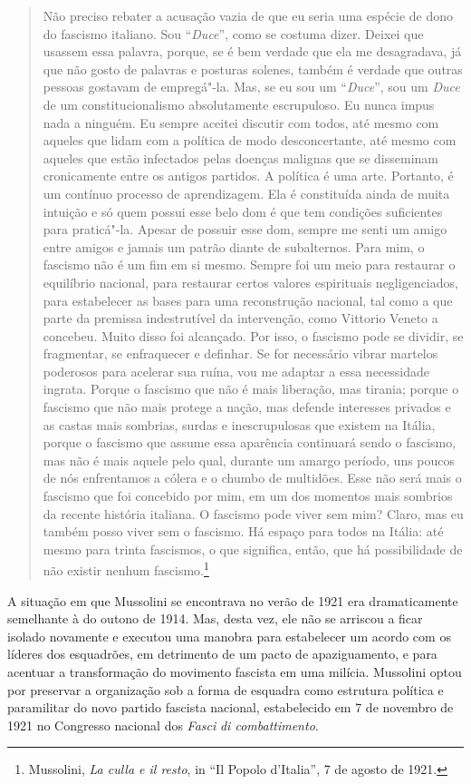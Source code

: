 \begin{quote}
Não preciso rebater a acusação vazia de que eu seria uma espécie de dono
do fascismo italiano. Sou ``\emph{Duce}'', como se costuma dizer. Deixei
que usassem essa palavra, porque, se é bem verdade que ela me
desagradava, já que não gosto de palavras e posturas solenes, também é
verdade que outras pessoas gostavam de empregá"-la. Mas, se eu sou um
``\emph{Duce}'', sou um \emph{Duce} de um constitucionalismo
absolutamente escrupuloso. Eu nunca impus nada a ninguém. Eu sempre
aceitei discutir com todos, até mesmo com aqueles que lidam com a
política de modo desconcertante, até mesmo com aqueles que estão
infectados pelas doenças malignas que se disseminam cronicamente entre
os antigos partidos. A política é uma arte. Portanto, é um contínuo
processo de aprendizagem. Ela é constituída ainda de muita intuição e só
quem possui esse belo dom é que tem condições suficientes para
praticá"-la. Apesar de possuir esse dom, sempre me senti um amigo entre
amigos e jamais um patrão diante de subalternos. Para mim, o fascismo
não é um fim em si mesmo. Sempre foi um meio para restaurar o equilíbrio
nacional, para restaurar certos valores espirituais negligenciados, para
estabelecer as bases para uma reconstrução nacional, tal como a que
parte da premissa indestrutível da intervenção, como Vittorio Veneto a
concebeu. Muito disso foi alcançado. Por isso, o fascismo pode se
dividir, se fragmentar, se enfraquecer e definhar. Se for necessário
vibrar martelos poderosos para acelerar sua ruína, vou me adaptar a essa
necessidade ingrata. Porque o fascismo que não é mais liberação, mas
tirania; porque o fascismo que não mais protege a nação, mas defende
interesses privados e as castas mais sombrias, surdas e inescrupulosas
que existem na Itália, porque o fascismo que assume essa aparência
continuará sendo o fascismo, mas não é mais aquele pelo qual, durante um
amargo período, uns poucos de nós enfrentamos a cólera e o chumbo de
multidões. Esse não será mais o fascismo que foi concebido por mim, em
um dos momentos mais sombrios da recente história italiana. O fascismo
pode viver sem mim? Claro, mas eu também posso viver sem o fascismo. Há
espaço para todos na Itália: até mesmo para trinta fascismos, o que
significa, então, que há possibilidade de não existir nenhum
fascismo.\footnote{Mussolini, \emph{La culla e il resto}, in ``Il Popolo
  d'Italia'', 7 de agosto de 1921.}
\end{quote}

A situação em que Mussolini se encontrava no verão de 1921 era
dramaticamente semelhante à do outono de 1914. Mas, desta vez, ele não
se arriscou a ficar isolado novamente e executou uma manobra para
estabelecer um acordo com os líderes dos esquadrões, em detrimento de um
pacto de apaziguamento, e para acentuar a transformação do movimento
fascista em uma milícia. Mussolini optou por preservar a organização sob
a forma de esquadra como estrutura política e paramilitar do novo
partido fascista nacional, estabelecido em 7 de novembro de 1921 no
Congresso nacional dos \emph{Fasci} \emph{di combattimento}.

